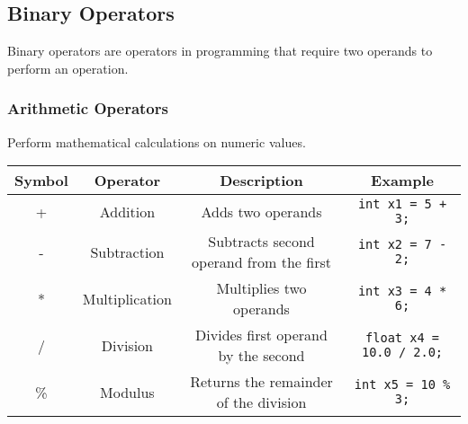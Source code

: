 \documentclass[11pt,A4]{article}
\begin{document}
        \subsection{Binary Operators}
        Binary operators are operators in programming that require two operands to perform an operation. 
            \newpage
            \subsubsection{Arithmetic Operators} 
            Perform mathematical calculations on numeric values.
            \begin{table}[h]
                \centering
                \setlength{\arrayrulewidth}{0.3mm}
                \renewcommand{\arraystretch}{1.2}
                \begin{tabular}{cccc}
                    \toprule
                    Symbol & Operator & Description & Example \\
                    \midrule
                    + & Addition & Adds two operands & \verb|int x1 = 5 + 3;| \\
                    \arrayrulecolor{gray!50}\cmidrule(lr){1-4}\arrayrulecolor{black}
                    - & Subtraction & Subtracts second operand from the first & \verb|int x2 = 7 - 2;| \\
                    \arrayrulecolor{gray!50}\cmidrule(lr){1-4}\arrayrulecolor{black}
                    * & Multiplication & Multiplies two operands & \verb|int x3 = 4 * 6;| \\
                    \arrayrulecolor{gray!50}\cmidrule(lr){1-4}\arrayrulecolor{black}
                    / & Division & Divides first operand by the second & \verb|float x4 = 10.0 / 2.0;| \\
                    \arrayrulecolor{gray!50}\cmidrule(lr){1-4}\arrayrulecolor{black}
                    \% & Modulus & Returns the remainder of the division & \verb|int x5 = 10 % 3;| \\
                    \bottomrule
                \end{tabular}
            \end{table} 
            
\end{document}
